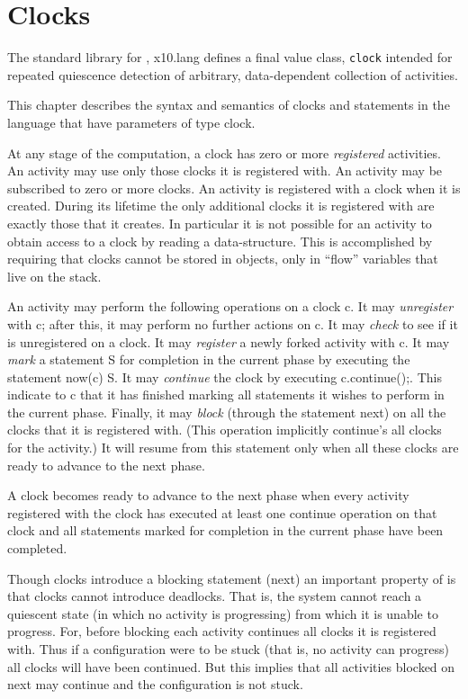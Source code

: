 \chapter{Clocks}\label{XtenClocks}

The standard library for \Xten{}, {\cf x10.lang} defines a {\cf final
value class}, {\tt clock} intended for repeated quiescence detection
of arbitrary, data-dependent collection of activities.

This chapter describes the syntax and semantics of clocks and
statements in the language that have parameters of type {\cf clock}. 

At any stage of the computation, a clock has zero or more {\em
registered} activities. An activity may use only those clocks it is
registered with. An activity may be subscribed to zero or more
clocks. An activity is registered with a clock when it is created.
During its lifetime the only additional clocks it is registered with
are exactly those that it creates. In particular it is not possible
for an activity to obtain access to a clock by reading a
data-structure. This is accomplished by requiring that clocks cannot
be stored in objects, only in ``flow'' variables that live on the
stack.

An activity may perform the following operations on a clock {\cf
c}. It may {\em unregister} with {\cf c}; after this, it may perform
no further actions on {\cf c}. It may {\em check} to see if it is
unregistered on a clock. It may {\em register} a newly forked activity
with {\cf c}.  It may {\em mark} a statement {\cf S} for completion in
the current phase by executing the statement {\cf now(c) S}. It may
{\em continue} the clock by executing {\cf c.continue();}. This
indicate to {\cf c} that it has finished marking all statements it
wishes to perform in the current phase. Finally, it may {\em block}
(through the statement {\cf next}) on all the clocks that it is
registered with. (This operation implicitly {\cf continue}'s all
clocks for the activity.) It will resume from this statement only when
all these clocks are ready to advance to the next phase.

A clock becomes ready to advance to the next phase when every activity
registered with the clock has executed at least one {\cf continue}
operation on that clock and all statements marked for completion in
the current phase have been completed.

Though clocks introduce a blocking statement ({\cf next}) an important
property of \Xten{} is that clocks cannot introduce deadlocks. That is,
the system cannot reach a quiescent state (in which no activity is
progressing) from which it is unable to progress. For, before blocking
each activity continues all clocks it is registered with. Thus if a
configuration were to be stuck (that is, no activity can progress) all
clocks will have been continued. But this implies that all activities
blocked on {\cf next} may continue and the configuration is not stuck.

